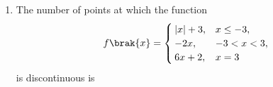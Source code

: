 \begin{enumerate}[label=\thesubsection.\arabic*, ref=\thesubsection.\theenumi]
\solution
Given,
\begin{align}
\mydet{
-a & a & a\\
b & -b & b\\
c & c & -c
}
= kabc,
\end{align}
Taking $a$, $b$, and $c$ common from the first,
second, and third rows respectively, we get

\begin{align}
=abc
\mydet{
-1 & 1 & 1\\
1 & -1 & 1\\
1 & 1 & -1
}
\end{align}
using the \eqref{eq:EE26BTECH11211-Prob_1} expanding the determinant.
\begin{align}
=abc\left[
\brak{-1}\brak{1-1}
-\brak{ -1-1}
+\brak{1+1}
\right].
&=abc[0+2+2]
&=4abc.
\end{align}
Comparing this result with $kabc$, we obtain
\begin{align}
kabc=4abc.
\end{align}

Therefore,

\begin{align}
k=4
\end{align}
Hence, the correct answer is

\item
The number of points at which the function
\[
f\brak{x}=
\begin{cases}
|x|+3, & x\leq -3,\\
-2x, & -3<x<3,\\
6x+2, & x= 3
\end{cases}
\]
is discontinuous is


\end{enumerate}
